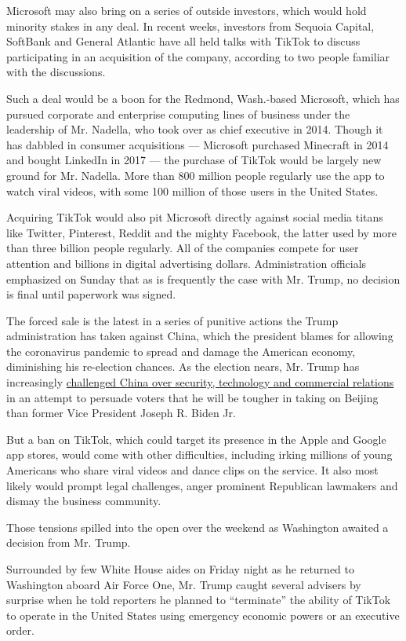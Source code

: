 Microsoft may also bring on a series of outside investors, which would
hold minority stakes in any deal. In recent weeks, investors from
Sequoia Capital, SoftBank and General Atlantic have all held talks with
TikTok to discuss participating in an acquisition of the company,
according to two people familiar with the discussions.

Such a deal would be a boon for the Redmond, Wash.-based Microsoft,
which has pursued corporate and enterprise computing lines of business
under the leadership of Mr. Nadella, who took over as chief executive in
2014. Though it has dabbled in consumer acquisitions --- Microsoft
purchased Minecraft in 2014 and bought LinkedIn in 2017 --- the purchase
of TikTok would be largely new ground for Mr. Nadella. More than 800
million people regularly use the app to watch viral videos, with some
100 million of those users in the United States.

Acquiring TikTok would also pit Microsoft directly against social media
titans like Twitter, Pinterest, Reddit and the mighty Facebook, the
latter used by more than three billion people regularly. All of the
companies compete for user attention and billions in digital advertising
dollars. Administration officials emphasized on Sunday that as is
frequently the case with Mr. Trump, no decision is final until paperwork
was signed.

The forced sale is the latest in a series of punitive actions the Trump
administration has taken against China, which the president blames for
allowing the coronavirus pandemic to spread and damage the American
economy, diminishing his re-election chances. As the election nears, Mr.
Trump has increasingly
\href{https://www.nytimes3xbfgragh.onion/2020/07/25/world/asia/us-china-trump-xi.html}{challenged
China over security, technology and commercial relations} in an attempt
to persuade voters that he will be tougher in taking on Beijing than
former Vice President Joseph R. Biden Jr.

But a ban on TikTok, which could target its presence in the Apple and
Google app stores, would come with other difficulties, including irking
millions of young Americans who share viral videos and dance clips on
the service. It also most likely would prompt legal challenges, anger
prominent Republican lawmakers and dismay the business community.

Those tensions spilled into the open over the weekend as Washington
awaited a decision from Mr. Trump.

Surrounded by few White House aides on Friday night as he returned to
Washington aboard Air Force One, Mr. Trump caught several advisers by
surprise when he told reporters he planned to ``terminate'' the ability
of TikTok to operate in the United States using emergency economic
powers or an executive order.

